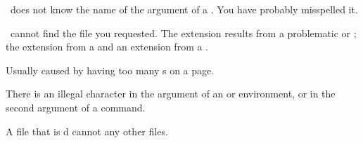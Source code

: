 \begin{plainlist}



\item[]  

    \ltx\ does not know the name of the argument of a \cmd{\begin}.
You have probably misspelled it.



\item[]

    \ltx\ cannot find the file you requested. The extension 
results from a problematic \cmd{} or \cmd{}; the extension
 from a \cmd{\usepackage} and an extension 
from a \cmd{\documentclass}. 

\item[] 

    Usually caused by having too many \cmd{\marginpar}s on a page.






\item[] 

    There is an illegal character in the argument of an  or
 environment, or in the second argument of a
\cmd{\multicolumn} command.

\item[]

    A file that is \cmd{}d cannot \cmd{} any other files.




\end{plainlist}
